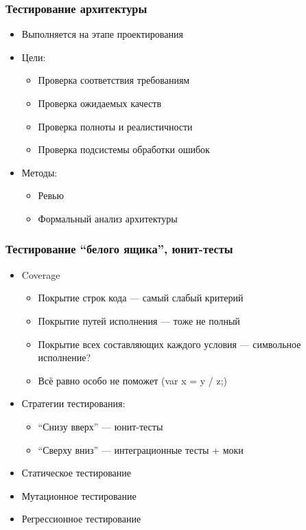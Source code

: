 \documentclass[xetex,mathserif,serif]{beamer}
\begin{document}
	\begin{frame}
		\frametitle{Тестирование архитектуры}
		\begin{itemize}
			\item Выполняется на этапе проектирования
			\item Цели:
			\begin{itemize}
				\item Проверка соответствия требованиям
				\item Проверка ожидаемых качеств
				\item Проверка полноты и реалистичности
				\item Проверка подсистемы обработки ошибок
			\end{itemize}
			\item Методы:
			\begin{itemize}
				\item Ревью
				\item Формальный анализ архитектуры
			\end{itemize}
		\end{itemize}
	\end{frame}

	\begin{frame}
		\frametitle{Тестирование ``белого ящика'', юнит-тесты}
		\begin{itemize}
			\item Coverage
			\begin{itemize}
				\item Покрытие строк кода --- самый слабый критерий
				\item Покрытие путей исполнения --- тоже не полный
				\item Покрытие всех составляющих каждого условия --- символьное исполнение?
				\item Всё равно особо не поможет (var x = y / z;)
			\end{itemize}
			\item Стратегии тестирования:
			\begin{itemize}
				\item ``Снизу вверх'' --- юнит-тесты
				\item ``Сверху вниз'' --- интеграционные тесты + моки
			\end{itemize}
			\item Статическое тестирование
			\item Мутационное тестирование
			\item Регрессионное тестирование
		\end{itemize}
	\end{frame}
\end{document}
